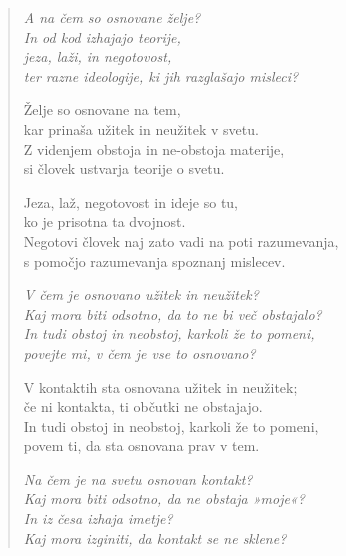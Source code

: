\clearpage
\begin{verse}

\emph{A na čem so osnovane želje?}\\
\emph{In od kod izhajajo teorije,}\\
\emph{jeza, laži, in negotovost,}\\
\emph{ter razne ideologije, ki jih razglašajo misleci?}

Želje so osnovane na tem,\\
kar prinaša užitek in neužitek v svetu.\\
Z videnjem obstoja in ne-obstoja materije,\\
si človek ustvarja teorije o svetu.

Jeza, laž, negotovost in ideje so tu,\\
ko je prisotna ta dvojnost.\\
Negotovi človek naj zato vadi na poti razumevanja,\\
s pomočjo razumevanja spoznanj mislecev.

\emph{V čem je osnovano užitek in neužitek?}\\
\emph{Kaj mora biti odsotno, da to ne bi več obstajalo?}\\
\emph{In tudi obstoj in neobstoj, karkoli že to pomeni,}\\
\emph{povejte mi, v čem je vse to osnovano?}

V kontaktih sta osnovana užitek in neužitek;\\
če ni kontakta, ti občutki ne obstajajo.\\
In tudi obstoj in neobstoj, karkoli že to pomeni,\\
povem ti, da sta osnovana prav v tem.

\emph{Na čem je na svetu osnovan kontakt?\\
Kaj mora biti odsotno, da ne obstaja »moje«?}\\
\emph{In iz česa izhaja imetje?}\\
\emph{Kaj mora izginiti, da kontakt se ne sklene?}

\end{verse}


